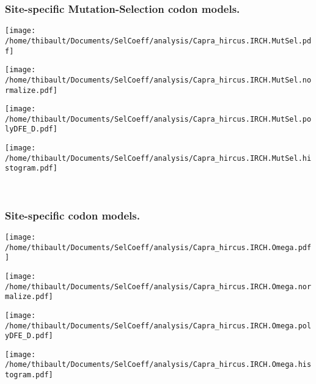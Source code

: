 \subsubsection*{Site-specific Mutation-Selection codon models.} 
\begin{minipage}{0.49\linewidth} 
\texttt{[image: /home/thibault/Documents/SelCoeff/analysis/Capra\_hircus.IRCH.MutSel.pdf]} 
\end{minipage}
\begin{minipage}{0.49\linewidth} 
\texttt{[image: /home/thibault/Documents/SelCoeff/analysis/Capra\_hircus.IRCH.MutSel.normalize.pdf]} 
\end{minipage}
\begin{minipage}{0.49\linewidth} 
\texttt{[image: /home/thibault/Documents/SelCoeff/analysis/Capra\_hircus.IRCH.MutSel.polyDFE\_D.pdf]} 
\end{minipage}
\begin{minipage}{0.49\linewidth} 
\texttt{[image: /home/thibault/Documents/SelCoeff/analysis/Capra\_hircus.IRCH.MutSel.histogram.pdf]} 
\end{minipage}
\\ 
\subsubsection*{Site-specific codon models.} 
\begin{minipage}{0.49\linewidth} 
\texttt{[image: /home/thibault/Documents/SelCoeff/analysis/Capra\_hircus.IRCH.Omega.pdf]} 
\end{minipage}
\begin{minipage}{0.49\linewidth} 
\texttt{[image: /home/thibault/Documents/SelCoeff/analysis/Capra\_hircus.IRCH.Omega.normalize.pdf]} 
\end{minipage}
\begin{minipage}{0.49\linewidth} 
\texttt{[image: /home/thibault/Documents/SelCoeff/analysis/Capra\_hircus.IRCH.Omega.polyDFE\_D.pdf]} 
\end{minipage}
\begin{minipage}{0.49\linewidth} 
\texttt{[image: /home/thibault/Documents/SelCoeff/analysis/Capra\_hircus.IRCH.Omega.histogram.pdf]} 
\end{minipage}
\\ 
